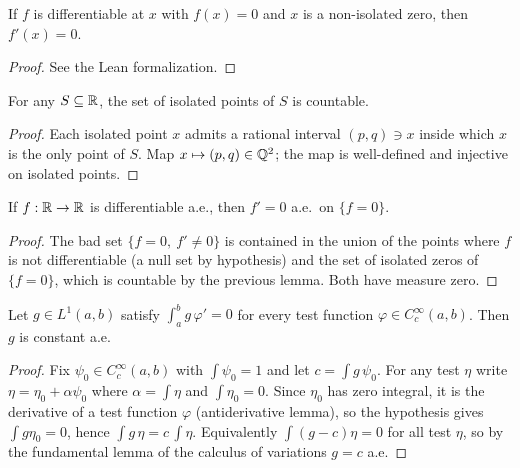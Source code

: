 \begin{corollary}
\label{cor:HasDerivAt_deriv_eq_zero_of_zero_and_not_isolated}
\leanok
If $f$ is differentiable at $x$ with $f(x) = 0$ and $x$ is a non-isolated zero, then
$f'(x) = 0$.
\end{corollary}

\begin{proof}
\leanok
{}
See the Lean formalization.
\end{proof}

\begin{lemma}
\label{lem:countable_isolated}
\leanok
For any $S \subseteq \mathbb{R}$, the set of isolated points of $S$ is countable.
\end{lemma}
\begin{proof}
\leanok

Each isolated point $x$ admits a rational interval $(p,q) \ni x$ inside which $x$ is the
only point of $S$. Map $x \mapsto (p,q) \in \mathbb{Q}^{2}$; the map is well-defined and
injective on isolated points.
\end{proof}

\begin{lemma}
\label{lem:deriv_eq_zero_ae_on_zeroSet}
\leanok
If $f : \mathbb{R} \to \mathbb{R}$ is differentiable a.e., then $f' = 0$ a.e.\ on $\{f = 0\}$.
\end{lemma}
\begin{proof}
\leanok
{}

The bad set $\{f = 0,\ f' \neq 0\}$ is contained in the union of the points where $f$
is not differentiable (a null set by hypothesis) and the set of isolated zeros of
$\{f = 0\}$, which is countable by the previous lemma. Both have measure zero.
\end{proof}

\begin{lemma}
\label{lem:du_bois_reymond}
\leanok
Let $g \in L^{1}(a,b)$ satisfy $\int_a^b g\,\varphi' = 0$ for every test function
$\varphi \in C_c^{\infty}(a,b)$. Then $g$ is constant a.e.
\end{lemma}
\begin{proof}
\leanok
{}

Fix $\psi_0 \in C_c^{\infty}(a,b)$ with $\int \psi_0 = 1$ and let
$c = \int g\,\psi_0$. For any test $\eta$ write $\eta = \eta_0 + \alpha \psi_0$ where
$\alpha = \int\eta$ and $\int \eta_0 = 0$. Since $\eta_0$ has zero integral, it is the
derivative of a test function $\varphi$ (antiderivative lemma), so the hypothesis gives
$\int g \eta_0 = 0$, hence $\int g\,\eta = c\,\int\eta$. Equivalently
$\int (g - c)\eta = 0$ for all test $\eta$, so by the fundamental lemma of the calculus
of variations $g = c$ a.e.
\end{proof}

